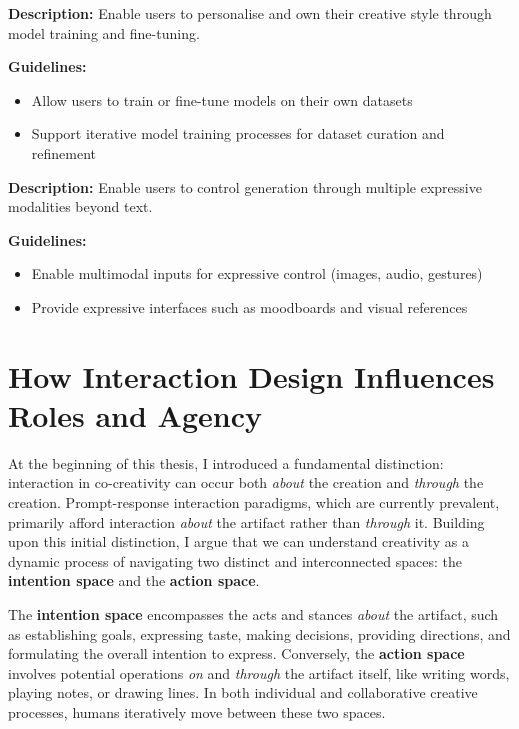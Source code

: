 \begin{tcolorbox}[colback=purple!5,colframe=purple!75!black,title=\textbf{Principle 4: Personalisation}]
\textbf{Description:} Enable users to personalise and own their creative style through model training and fine-tuning.

\textbf{Guidelines:}
\begin{itemize}
\item Allow users to train or fine-tune models on their own datasets
\item Support iterative model training processes for dataset curation and refinement
\end{itemize}
\end{tcolorbox}

\begin{tcolorbox}[colback=red!5,colframe=red!75!black,title=\textbf{Principle 5: Expressiveness}]
\textbf{Description:} Enable users to control generation through multiple expressive modalities beyond text.

\textbf{Guidelines:}
\begin{itemize}
\item Enable multimodal inputs for expressive control (images, audio, gestures)
\item Provide expressive interfaces such as moodboards and visual references
\end{itemize}
\end{tcolorbox}


\section{How Interaction Design Influences Roles and Agency}

At the beginning of this thesis, I introduced a fundamental distinction: interaction in co-creativity can occur both \textit{about} the creation and \textit{through} the creation. Prompt-response interaction paradigms, which are currently prevalent, primarily afford interaction \textit{about} the artifact rather than \textit{through} it. Building upon this initial distinction, I argue that we can understand creativity as a dynamic process of navigating two distinct and interconnected spaces: the \textbf{intention space} and the \textbf{action space}.

The \textbf{intention space} encompasses the acts and stances \textit{about} the artifact, such as establishing goals, expressing taste, making decisions, providing directions, and formulating the overall intention to express. Conversely, the \textbf{action space} involves potential operations \textit{on} and \textit{through} the artifact itself, like writing words, playing notes, or drawing lines. In both individual and collaborative creative processes, humans iteratively move between these two spaces.

